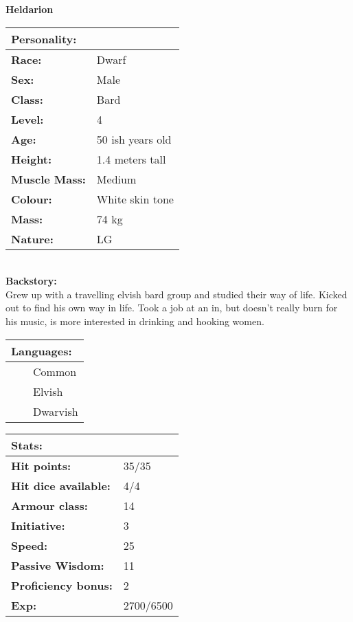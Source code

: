 \documentclass[11pt]{article}
\newcommand{\tabitem}{~~\llap{--}~~}
\begin{document}
	\begin{center}
\Huge \textbf{Heldarion}
	\end{center}
	\begin{multicols}{2}
\noindent \begin{tabularx}{95mm}{@{}l l}
\Large \textbf{Personality:} 	& 						\\
\hline
\textbf{Race:} 					& Dwarf	 				\\
\textbf{Sex:} 					& Male 					\\
\textbf{Class:}					& Bard					\\
\textbf{Level:} 				& 4						\\
\textbf{Age:} 					& 50 ish years old		\\
\textbf{Height:} 				& 1.4 meters tall 	\\
\textbf{Muscle Mass:} 			& Medium 				\\
\textbf{Colour:} 				& White skin tone 	\\
\textbf{Mass:} 					& 74 kg		 		\\
\textbf{Nature:} 				& LG
		\end{tabularx} \\
\textbf{Backstory:} \\
Grew up with a travelling elvish bard group and studied their way of life. Kicked out to find his own way in life. Took a job at an in, but doesn't really burn for his music, is more interested in drinking and hooking women.

\vspace{2mm}

\noindent \begin{tabularx}{95mm}{@{}l}
{\Large \textbf{Languages:}} \\
\hline
\tabitem Common \\
\tabitem Elvish	\\
\tabitem Dwarvish
		\end{tabularx}

\vspace{2mm}

\noindent \begin{tabularx}{95mm}{@{}l l}
\Large \textbf{Stats:}		 	& 							\\
\hline
\textbf{Hit points:} 			& 35/35 					\\
\textbf{Hit dice available:}	& 4/4						\\
\textbf{Armour class:} 			& 14						\\
\textbf{Initiative:} 			& 3							\\
\textbf{Speed:} 				& 25	 					\\
\textbf{Passive Wisdom:} 		& 11			 			\\
\textbf{Proficiency bonus:}		& 2							\\
\textbf{Exp:} 					& 2700/6500
		\end{tabularx}


\end{multicols}
\end{document}
